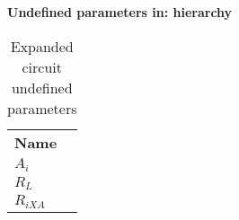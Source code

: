 {\textbf{Undefined parameters in: hierarchy}}

\begin{table}[H]
\centering
\begin{tabular}[c]{l}
\textbf{Name} \\ 
\rowcolor{myyellow}
$A_{i}$ \\ 
$R_{L}$ \\ 
\rowcolor{myyellow}
$R_{i XA}$ \\ 
\end{tabular}
\caption{Expanded circuit undefined parameters}
\end{table}

